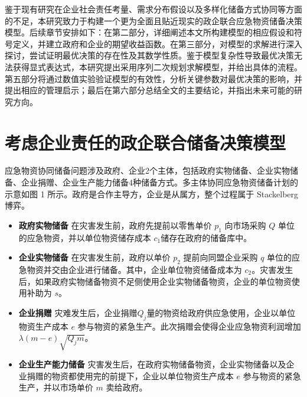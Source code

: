 \documentclass[a4paper,8pt,twocolumn]{article} %
\begin{document}
鉴于现有研究在企业社会责任考量、需求分布假设以及多样化储备方式协同等方面的不足，本研究致力于构建一个更为全面且贴近现实的政企联合应急物资储备决策模型。后续章节安排如下：在第二部分，详细阐述本文所构建模型的相应假设和符号定义，并建立政府和企业的期望收益函数。在第三部分，对模型的求解进行深入探讨，尝试证明最优决策的存在性及其数学性质。鉴于模型复杂性导致最优决策无法获得显式表达式，本研究提出采用序列二次规划求解模型，并给出具体的流程。第五部分将通过数值实验验证模型的有效性，分析关键参数对最优决策的影响，并提出相应的管理启示；最后在第六部分总结全文的主要结论，并指出未来可能的研究方向。

\section{考虑企业责任的政企联合储备决策模型}

应急物资协同储备问题涉及政府、企业2个主体，包括政府实物储备、企业实物储备、企业捐赠、企业生产能力储备4种储备方式。多主体协同应急物资储备计划的示意如图 1 所示。政府是合作主导方，企业是从属方，整个过程属于 Stackelberg 博弈\cite{Li2022Stackelberg}。

\begin{itemize}
    \item \textbf{政府实物储备} \quad 在灾害发生前，政府先提前以零售单价 $p_1$ 向市场采购 $Q$ 单位的应急物资，并以单位物资储存成本 $c_1 $储存在政府的储备库中。
    \item \textbf{企业实物储备} \quad 在灾害发生前，政府以单价 $p_2$ 提前向同盟企业采购 $q$ 单位的应急物资并交由企业进行储备。其中，企业单位物资储备成本为 $c_2$。灾害发生后，如果政府实物储备物资不足侧使用企业实物储备物资，企业的单位物资使用补助为 $s$。
    \item \textbf{企业捐赠} \quad 灾难发生后，企业捐赠$Q_j$量的物资给政府供应急使用，企业以单位物资生产成本 $e$ 参与物资的紧急生产。此次捐赠会使得企业应急物资利润增加$\lambda(m-e)\sqrt{Q_jm}$。
    \item  \textbf{企业生产能力储备} \quad 灾害发生后，在政府实物储备物资，企业实物储备以及企业捐赠的物资都使用完的前提下，企业以单位物资生产成本 $e$ 参与物资的紧急生产，并以市场单价 $m$ 卖给政府。
\end{itemize}
\end{document}
